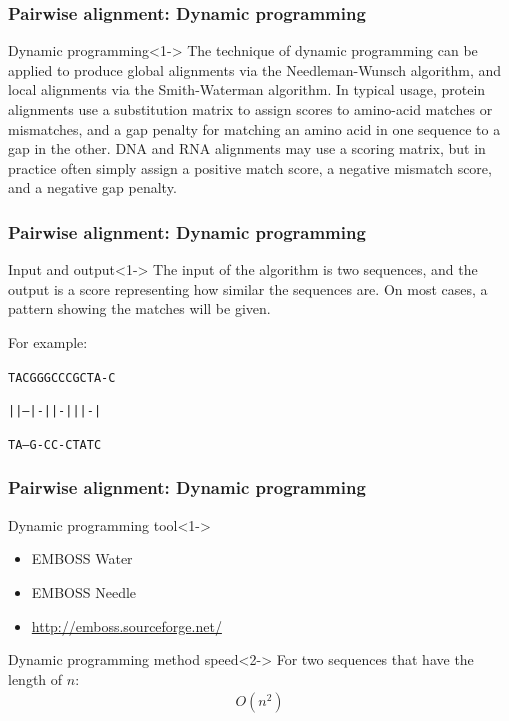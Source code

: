 \documentclass[UTF8]{beamer}
\begin{document}
	\begin{frame}
	    \frametitle{Pairwise alignment: Dynamic programming}
		\begin{block}{Dynamic programming}<1->
			The technique of dynamic programming can be applied to produce global alignments via the \alert{Needleman-Wunsch algorithm}, and local alignments via the \alert{Smith-Waterman algorithm}. 
			In typical usage, protein alignments use a \alert{substitution matrix} to assign scores to amino-acid matches or mismatches, 
			and a gap penalty for matching an amino acid in one sequence to a gap in the other. DNA and RNA alignments may use a scoring matrix, 
			but in practice often simply assign a positive match score, a negative mismatch score, and a negative gap penalty.
		\end{block}
    \end{frame}

	\begin{frame}
	    \frametitle{Pairwise alignment: Dynamic programming}
		\begin{block}{Input and output}<1->
			The input of the algorithm is two sequences, and the output is a score representing how similar the sequences are.
			On most cases, a pattern showing the matches will be given.

			For example:

			\texttt{TACGGGCCCGCTA-C}

			\texttt{||---|-||-|||-|}
			
			\texttt{TA---G-CC-CTATC}
		\end{block}
    \end{frame}

	\begin{frame}
	    \frametitle{Pairwise alignment: Dynamic programming}
		\begin{block}{Dynamic programming tool}<1->
			\begin{itemize}
				\item EMBOSS Water
				\item EMBOSS Needle
				\item \url{http://emboss.sourceforge.net/}
			\end{itemize}
		\end{block}
		\begin{block}{Dynamic programming method speed}<2->
			For two sequences that have the length of $n$:
			\begin{gather*}
				O(n^2)
			\end{gather*}
		\end{block}
    \end{frame}
\end{document}
